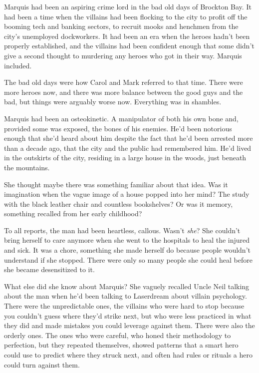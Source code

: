 Marquis had been an aspiring crime lord in the bad old days of Brockton Bay.  It had been a time when the villains had been flocking to the city to profit off the booming tech and banking sectors, to recruit mooks and henchmen from the city's unemployed dockworkers.  It had been an era when the heroes hadn't been properly established, and the villains had been confident enough that some didn't give a second thought to murdering any heroes who got in their way.  Marquis included.



The bad old days were how Carol and Mark referred to that time.  There were more heroes now, and there was more balance between the good guys and the bad, but things were arguably worse now.  Everything was in shambles.



Marquis had been an osteokinetic.  A manipulator of both his own bone and, provided some was exposed, the bones of his enemies.  He'd been notorious enough that she'd heard about him despite the fact that he'd been arrested more than a decade ago, that the city and the public had remembered him.  He'd lived in the outskirts of the city, residing in a large house in the woods, just beneath the mountains.



She thought maybe there was something familiar about that idea.  Was it imagination when the vague image of a house popped into her mind?  The study with the black leather chair and countless bookshelves?  Or was it memory, something recalled from her early childhood?



To all reports, the man had been heartless, callous.  Wasn't \emph{she}?  She couldn't bring herself to care anymore when she went to the hospitals to heal the injured and sick.  It was a chore, something she made herself do because people wouldn't understand if she stopped.  There were only so many people she could heal before she became desensitized to it.



What else did she know about Marquis?  She vaguely recalled Uncle Neil talking about the man when he'd been talking to Laserdream about villain psychology.  There were the unpredictable ones, the villains who were hard to stop because you couldn't guess where they'd strike next, but who were less practiced in what they did and made mistakes you could leverage against them.  There were also the orderly ones.  The ones who were careful, who honed their methodology to perfection, but they repeated themselves, showed patterns that a smart hero could use to predict where they struck next, and often had rules or rituals a hero could turn against them.



